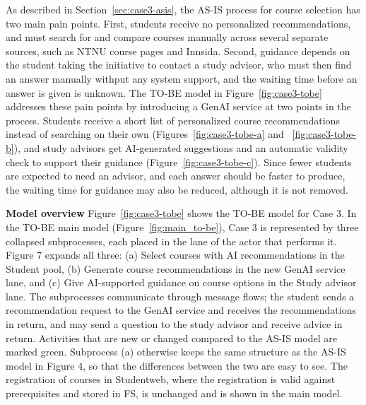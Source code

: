 As described in Section~\ref{sec:case3-asis}, the AS-IS process for course selection has two main pain points. First, students receive no personalized recommendations, and must search for and compare courses manually across several separate sources, such as NTNU course pages and Innsida. Second, guidance depends on the student taking the initiative to contact a study advisor, who must then find an answer manually withput any system support, and the waiting time before an answer is given is unknown. The TO-BE model in Figure~\ref{fig:case3-tobe} addresses these pain points by introducing a GenAI service at two points in the process. Students receive a short list of personalized course recommendations instead of searching on their own (Figures~\ref{fig:case3-tobe-a} and ~\ref{fig:case3-tobe-b}), and study advisors get AI-generated suggestions and an automatic validity check to support their guidance (Figure~\ref{fig:case3-tobe-c}). Since fewer students are expected to need an advisor, and each answer should be faster to produce, the waiting time for guidance may also be reduced, although it is not removed. 

\textbf{Model overview}
Figure~\ref{fig:case3-tobe} shows the TO-BE model for Case 3. In the TO-BE main model (Figure~\ref{fig:main_to-be}), Case 3 is represented by three collapsed subprocesses, each placed in the lane of the actor that performs it. Figure 7 expands all three: (a) Select courses with AI recommendations in the Student pool, (b) Generate course recommendations in the new GenAI service lane, and (c) Give AI-supported guidance on course options in the Study advisor lane. The subprocesses communicate through message flows; the student sends a recommendation request to the GenAI service and receives the recommendations in return, and may send a question to the study advisor and receive advice in return. Activities that are new or changed compared to the AS-IS model are marked green. Subprocess (a) otherwise keeps the same structure as the AS-IS model in Figure 4, so that the differences between the two are easy to see. The registration of courses in Studentweb, where the registration is valid against prerequisites and stored in FS, is unchanged and is shown in the main model. 

